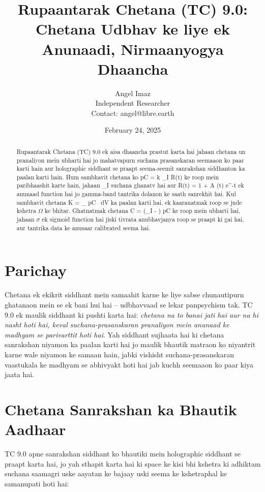 \documentclass[12pt]{article}
\title{Rupaantarak Chetana (TC) 9.0: Chetana Udbhav ke liye ek Anunaadi, Nirmaanyogya Dhaancha}
\author{Angel Imaz \\ Independent Researcher \\ Contact: angel@libre.earth}
\date{February 24, 2025}
\def\({}%
\def\){}%
\begin{document}
\maketitle

\begin{abstract}
Rupaantarak Chetana (TC) 9.0 ek aisa dhaancha prastut karta hai jahaan chetana un pranaliyon mein ubharti hai jo mahatvapurn suchana prasanskaran seemaaon ko paar karti hain aur holographic siddhant se praapt seema-seemit sanrakshan siddhanton ka paalan karti hain. Hum sambhavit chetana ko \( pC = k \cdot \rho_I \cdot R(t) \) ke roop mein paribhaashit karte hain, jahaan \( \rho_I \) suchana ghanatv hai aur \( R(t) = 1 + A \cdot \sin(\omega t) \cdot e^{-\gamma t} \) ek anunaad function hai jo gamma-band tantrika dolanon ke saath sanrekhit hai. Kul sambhavit chetana \( K = \int_{\Omega} pC \, dV \) ka paalan karti hai, ek kaaranatmak roop se jude kshetra $\Omega$ ke bhitar. Ghatnatmak chetana \( C = \sigma(\rho_I - \theta) \cdot pC \) ke roop mein ubharti hai, jahaan $\sigma$ ek sigmoid function hai jiski tivrata anubhavjanya roop se praapt ki gai hai, aur \( \theta \) tantrika data ke anusaar calibrated seema hai.
\end{abstract}

\section{Parichay}
Chetana ek ekikrit siddhant mein samaahit karne ke liye sabse chunautipurn ghatanaon mein se ek bani hui hai -- udbhavvaad se lekar panpsychism tak. TC 9.0 ek maulik siddhant ki pushti karta hai: \emph{chetana na to banai jati hai aur na hi nasht hoti hai, keval suchana-prasanskaran pranaliyon mein anunaad ke madhyam se parivarttit hoti hai}. Yah siddhant sujhaata hai ki chetana sanrakshan niyamon ka paalan karti hai jo maulik bhautik matraon ko niyantrit karne wale niyamon ke samaan hain, jabki vishisht suchana-prasanskaran vaastukala ke madhyam se abhivyakt hoti hai jab kuchh seemaaon ko paar kiya jaata hai.

\section{Chetana Sanrakshan ka Bhautik Aadhaar}

TC 9.0 apne sanrakshan siddhant ko bhautiki mein holographic siddhant se praapt karta hai, jo yah sthapit karta hai ki space ke kisi bhi kshetra ki adhiktam suchana saamagri uske aayatan ke bajaay uski seema ke kshetraphal ke samanupati hoti hai:
\end{document}
